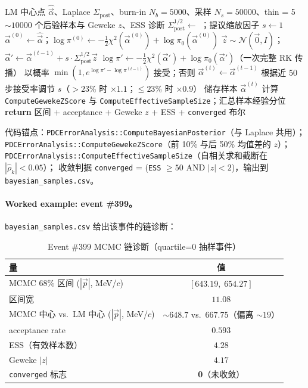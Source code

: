 \documentclass[a4paper, 11pt]{article}
\begin{document}
\begin{algorithm}[H]
\caption{方法五：自适应 Metropolis-Hastings（per track）}
\label{alg:mcmc}
\begin{algorithmic}[1]
\Require LM 中心点 $\hat{\vec{\alpha}}$、Laplace $\Sigma_\mathrm{post}$、burn-in $N_b = 5000$、采样 $N_s = 50000$、thin = 5
\Ensure $\sim 10000$ 个后验样本与 Geweke $z$、ESS 诊断
\State $\Sigma_\mathrm{post}^{1/2} \gets$ ；提议缩放因子 $s \gets 1$
\State $\vec{\alpha}^{(0)} \gets \hat{\vec{\alpha}}$；$\log\pi^{(0)} \gets -\tfrac{1}{2}\chi^2(\vec{\alpha}^{(0)}) + \log \pi_0(\vec{\alpha}^{(0)})$
  \State $\vec{z} \sim \mathcal{N}(\vec{0}, I)$；$\vec{\alpha}' \gets \vec{\alpha}^{(t-1)} + s \cdot \Sigma_\mathrm{post}^{1/2} \vec{z}$
  \State $\log\pi' \gets -\tfrac{1}{2}\chi^2(\vec{\alpha}') + \log \pi_0(\vec{\alpha}')$（一次完整 RK 传播）
  \State 以概率 $\min(1, e^{\log\pi' - \log\pi^{(t-1)}})$ 接受；否则 $\vec{\alpha}^{(t)} \gets \vec{\alpha}^{(t-1)}$
    \State 根据近 50 步接受率调节 $s$（$> 23\%$ 时 $\times 1.1$；$\leq 23\%$ 时 $\times 0.9$）
  \EndIf
    \State 储存样本 $\vec{\alpha}^{(t)}$
  \EndIf
\EndFor
\State 计算 \texttt{ComputeGewekeZScore} 与 \texttt{ComputeEffectiveSampleSize}；汇总样本经验分位
\State \textbf{return} 区间 + acceptance + Geweke $z$ + ESS + \texttt{converged} 布尔
\end{algorithmic}
\end{algorithm}

代码锚点：\texttt{PDCErrorAnalysis::ComputeBayesianPosterior}（与 Laplace 共用）；
\texttt{PDCErrorAnalysis::ComputeGewekeZScore}（前 10\% 与后 50\% 均值差的 $z$）；
\texttt{PDCErrorAnalysis::ComputeEffectiveSampleSize}（自相关求和截断在 $|\hat{\rho}_k| < 0.05$）；
收敛判据 \texttt{converged} = (\texttt{ESS} $\geq 50$ AND $|z| < 2$)，输出到 \texttt{bayesian\_samples.csv}。

\paragraph{Worked example: event \#399。}
\texttt{bayesian\_samples.csv} 给出该事件的链诊断：

\begin{table}[H]
\centering
\caption{Event \#399 MCMC 链诊断（quartile=0 抽样事件）}
\label{tab:mcmc_event399}
\begin{tabular}{lc}
\toprule
量 & 值 \\
\midrule
MCMC 68\% 区间 ($|\vec{p}|$, MeV/$c$) & $[643.19,\;654.27]$ \\
区间宽 & $11.08$ \\
MCMC 中心 vs.\ LM 中心 ($|\vec{p}|$, MeV/$c$) & $\sim 648.7$ vs.\ $667.75$（偏离 $\sim 19$） \\
acceptance rate & $0.593$ \\
ESS（有效样本数） & $4.28$ \\
Geweke $|z|$ & $4.17$ \\
\texttt{converged} 标志 & \textbf{0}（未收敛） \\
\bottomrule
\end{tabular}
\end{table}
\end{document}
